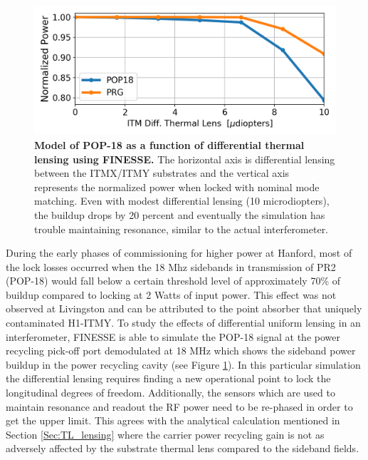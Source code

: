 	\begin{figure}[t!]
	\centering
	\includegraphics[width=0.75 \textwidth]{../Figures/POP_18dive.png}
	\caption[Model of POP-18 as a function of differential thermal lensing using FINESSE.]  
	{\textbf{Model of POP-18 as a function of differential thermal lensing using FINESSE.}
		The horizontal axis is differential lensing between the ITMX/ITMY substrates and the vertical axis represents the normalized power when locked with nominal mode matching.  Even with modest differential lensing (10 microdiopters), the buildup drops by 20 percent and eventually the simulation has trouble maintaining resonance, similar to the actual interferometer.
	}
	\label{fig:POP18}
	\end{figure}

	During the early phases of commissioning for higher power at Hanford, most of the lock losses occurred when the 18 Mhz sidebands in transmission of PR2 (POP-18) would fall below a certain threshold level of approximately 70\% of buildup compared to locking at 2 Watts of input power.  This effect was not observed at Livingston and can be attributed to the point absorber that uniquely contaminated H1-ITMY.  To study the effects of differential uniform lensing in an interferometer, FINESSE is able to simulate the POP-18 signal at the power recycling pick-off port demodulated at 18 MHz which shows the sideband power buildup in the power recycling cavity (see Figure \ref{fig:POP18}). In this particular simulation the differential lensing requires finding a new operational point to lock the longitudinal degrees of freedom.  Additionally, the sensors which are used to maintain resonance and readout the RF power need to be re-phased in order to get the upper limit.  This agrees with the analytical calculation mentioned in Section \ref{Sec:TL_lensing} where the carrier power recycling gain is not as adversely affected by the substrate thermal lens compared to the sideband fields.
	
